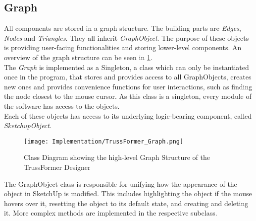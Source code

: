 \subsection{Graph}
All components are stored in a graph structure. The building parts are \textit{Edges}, \textit{Nodes} and \textit{Triangles}. They all inherit \textit{GraphObject}. The purpose of these objects is providing user-facing functionalities and storing lower-level components. An overview of the graph structure can be seen in \ref{fig:graph}.\\
The \textit{Graph} is implemented as a Singleton, a class which can only be instantiated once in the program, that stores and provides access to all GraphObjects, creates new ones and provides convenience functions for user interactions, such as finding the node closest to the mouse cursor. As this class is a singleton, every module of the software has access to the objects.\\
Each of these objects has access to its underlying logic-bearing component, called \textit{SketchupObject}.\\
\begin{figure}
    \texttt{[image: Implementation/TrussFormer\_Graph.png]}
    \centering
    \caption{Class Diagram showing the high-level Graph Structure of the TrussFormer Designer}
    \label{fig:graph}
\end{figure}
The GraphObject class is responsible for unifying how the appearance of the object in SketchUp is modified. This includes highlighting the object if the mouse hovers over it, resetting the object to its default state, and creating and deleting it. More complex methods are implemented in the respective subclass.
